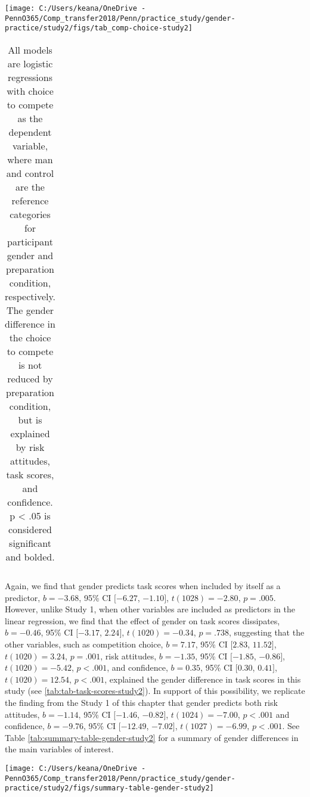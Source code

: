 \documentclass[letterpaper, nobind]{templates/ociamthesis}
\begin{document}
\begin{center}\texttt{[image: C:/Users/keana/OneDrive - PennO365/Comp\_transfer2018/Penn/practice\_study/gender-practice/study2/figs/tab\_comp-choice-study2]} \end{center}

\begin{table}[ht]
\centering
\begingroup\fontsize{0.1pt}{0.1pt}\selectfont
\begin{tabular}{r}
   \\ 
 \end{tabular}
\endgroup
\caption{All models are logistic regressions with choice to compete as the dependent variable, where man and control are the reference categories for participant gender and preparation condition, respectively. The gender difference in the choice to compete is not reduced by preparation condition, but is explained by risk attitudes, task scores, and confidence. p < .05 is considered significant and bolded.} 
\label{tab:tab-comp-choice-study2}
\end{table}

Again, we find that gender predicts task scores when included by itself as a predictor, \(b = -3.68\), 95\% CI \([-6.27\), \(-1.10]\), \(t(1028) = -2.80\), \(p = .005\). However, unlike Study 1, when other variables are included as predictors in the linear regression, we find that the effect of gender on task scores dissipates, \(b = -0.46\), 95\% CI \([-3.17\), \(2.24]\), \(t(1020) = -0.34\), \(p = .738\), suggesting that the other variables, such as competition choice, \(b = 7.17\), 95\% CI \([2.83\), \(11.52]\), \(t(1020) = 3.24\), \(p = .001\), risk attitudes, \(b = -1.35\), 95\% CI \([-1.85\), \(-0.86]\), \(t(1020) = -5.42\), \(p < .001\), and confidence, \(b = 0.35\), 95\% CI \([0.30\), \(0.41]\), \(t(1020) = 12.54\), \(p < .001\), explained the gender difference in task scores in this study (see \ref{tab:tab-task-scores-study2}). In support of this possibility, we replicate the finding from the Study 1 of this chapter that gender predicts both risk attitudes, \(b = -1.14\), 95\% CI \([-1.46\), \(-0.82]\), \(t(1024) = -7.00\), \(p < .001\) and confidence,
\(b = -9.76\), 95\% CI \([-12.49\), \(-7.02]\), \(t(1027) = -6.99\), \(p < .001\). See Table \ref{tab:summary-table-gender-study2} for a summary of gender differences in the main variables of interest.

\begin{center}\texttt{[image: C:/Users/keana/OneDrive - PennO365/Comp\_transfer2018/Penn/practice\_study/gender-practice/study2/figs/summary-table-gender-study2]} \end{center}
\end{document}
